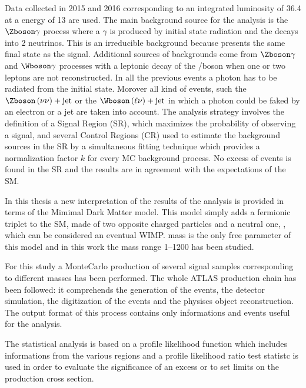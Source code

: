 Data collected in 2015 and 2016 corresponding to an integrated luminosity of \SI{36.4}{\ifb} at a \cm energy of \SI{13}{\tev} are used. The main background source for the \mph analysis is the $\Zboson\gamma$ process where a $\gamma$ is produced by initial state radiation and the \Zboson decays into 2 neutrinos. This is an irreducible background because presents the same final state as the signal. Additional sources of backgrounds come from $\Zboson\gamma$ and $\Wboson\gamma$ processes with a leptonic decay of the \Zboson/\Wboson boson when one or two leptons are not reconstructed. In all the previous events a photon has to be radiated from the initial state. Morover all kind of events, such the $\Zboson\left(\nu\nu\right)+\text{jet}$ or the $\Wboson\left(\ell\nu\right)+\text{jet}$ in which a photon could be faked by an electron or a jet are taken into account. The analysis strategy involves the definition of a Signal Region (SR), which maximizes the probability of observing a signal, and several Control Regions (CR) used to estimate the background sources in the SR by a simultaneous fitting technique which provides a normalization factor $k$ for every MC background process. No excess of events is found in the SR and the results are in agreement with the expectations of the SM.

In this thesis a new interpretation of the results of the \mph analysis is provided in terms of the Mimimal Dark Matter model. This model simply adds a fermionic triplet to the SM, made of two opposite charged particles \chipm and a neutral one, \chizero, which can be considered an eventual WIMP. \chizero mass is the only free parameter of this model and in this work the mass range \SIrange{1}{1200}{\gev} has been studied.
  
For this study a MonteCarlo production of several signal samples corresponding to different \chizero masses has been performed. The whole ATLAS production chain has been followed: it comprehends the generation of the events, the detector simulation, the digitization of the events and the physiscs object reconstruction. The output format of this process contains only informations and events useful for the \mph analysis. 

The statistical analysis is based on a profile likelihood function which includes informations from the various regions and a profile likelihood ratio test statistc is used in order to evaluate the significance of an excess or to set limits on the production cross section.

